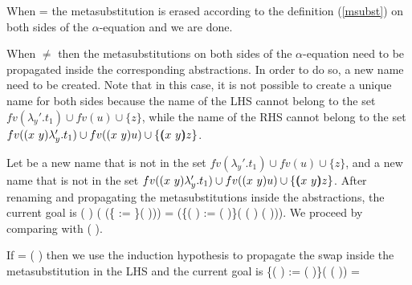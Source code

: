 \begin{coqdoccode}
\end{coqdoccode}
When  =  the metasubstitution is erased according to the definition (\ref{msubst}) on both sides of the $\alpha$-equation and we are done.
\begin{coqdoccode}
\end{coqdoccode}
When  \ensuremath{\not=}  then the metasubstitutions on both sides of the $\alpha$-equation need to be propagated inside the corresponding abstractions. In order to do so, a new name need to be created. Note that in this case, it is not possible to create a unique name for both sides because the name of the LHS cannot belong to the set $fv(\lambda_y'.t_1) \cup fv(u) \cup \{z\}$, while the name of the RHS cannot belong to the set $fv((x\ y) \lambda_y'.t_1) \cup fv((x\ y) u) \cup \{(\!\!(x\ y)\!\!) z\}$.
\begin{coqdoccode}
\end{coqdoccode}
Let  be a new name that is not in the set $fv(\lambda_y'.t_1) \cup fv(u) \cup \{z\}$, and  a new name that is not in the set $fv((x\ y) \lambda_y'.t_1) \cup fv((x\ y) u) \cup \{(\!\!(x\ y)\!\!) z\}$. After renaming and propagating the metasubstitutions inside the abstractions, the current goal is  (   ) (   (\{ := \}(   ))) =   (\{(   ) := (   )\}( (   )  (   ))). We proceed by comparing  with (   ).
\begin{coqdoccode}
\end{coqdoccode}
If  = (   ) then we use the induction hypothesis to propagate the swap inside the metasubstitution in the LHS and the current goal is \{(   ) := (   )\}(   (   )) =
